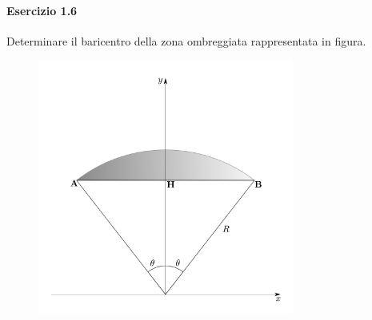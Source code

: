 \paragraph{Esercizio 1.6}
Determinare il baricentro della zona ombreggiata rappresentata in figura. 
\renewcommand{\thefigure}{1.6~-~1}
\begin{figure}[h]
\centering
\includegraphics[width=0.75\textwidth]{Immagini/Parte_1/Esercizio1_6/Esercizio1_6.pdf}
\caption{}
\label{Esercizio1_6}
\end{figure}


